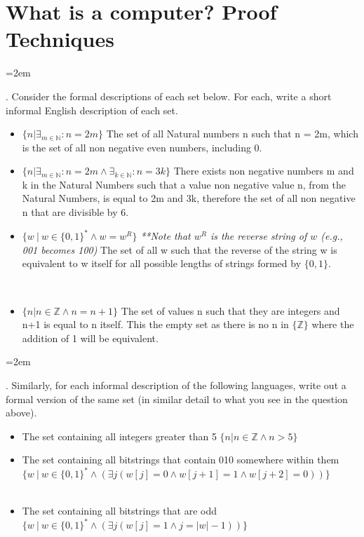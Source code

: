 \documentclass[12pt]{article}
\def\homework{What is a computer? Proof Techniques}
\newcounter{quesnum}
\newcommand{\question}[2][??]{
\begin{list}{\labelitemi}{\leftmargin=2em}
\item [\arabic{quesnum}.] {} {#2}
\end{list}
\addtocounter{quesnum}{1}
}
\begin{document}
\section*{\homework}

\question[3]{
Consider the formal descriptions of each set below. For each, write a short informal English description of each set.
}

\begin{itemize}
      \item $\{n | \exists_{m \in \mathbb{N}} : n=2m\}$ The set of all Natural numbers n such that n = 2m, which is the set of all non negative even numbers, including 0.
      \item $\{n | \exists_{m \in \mathbb{N}} : n=2m \wedge \exists_{k \in \mathbb{N}} : n=3k \}$ There exists non negative numbers m and k in the Natural Numbers such that a value non negative value n, from the Natural Numbers, is equal to 2m and 3k, therefore the set of all non negative n that are divisible by 6.
      \item $\{ w \ | \ w \in \{0,1\}^* \wedge w=w^R \}$ \emph{**Note that $w^R$ is the reverse string of $w$ (e.g., 001 becomes 100)} The set of all w such that the reverse of the string w is equivalent to w itself for all possible lengths of strings formed by $\{0,1\}$.
 
      \item $\{ n | n \in \mathbb{Z} \wedge n=n+1 \}$ The set of values n such that they are integers and n+1 is equal to n itself. This the empty set as there is no n in $\{\mathbb{Z}\}$ where the addition of 1 will be equivalent.
\end{itemize}

\vspace{12pt}

\question[3]{
Similarly, for each informal description of the following languages, write out a formal version of the same set (in similar detail to what you see in the question above).
}

\begin{itemize}
      \item The set containing all integers greater than 5
    $\{ n | n \in \mathbb{Z} \wedge n>5 \}$
      \item The set containing all bitstrings that contain 010 somewhere within them
    $\{ w \ | \ w \in \{0,1\}^* \wedge (\exists j (w[j] = 0 \wedge w[j+1] = 1 \wedge w[j+2] = 0)) \}$ %
      \item The set containing all bitstrings that are odd
    $\{ w \ | \ w \in \{0,1\}^* \wedge (\exists j(w[j] = 1 \wedge j=|w|-1)) \}$ %
\end{itemize}
\end{document}
